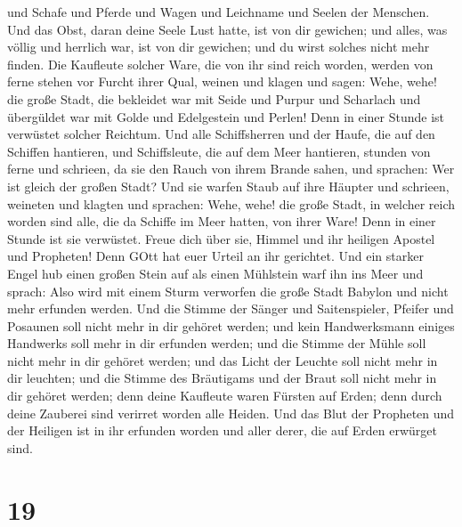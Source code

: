 und Schafe und Pferde und Wagen und Leichname und Seelen der Menschen.
 Und das Obst, daran deine Seele Lust hatte, ist von dir
gewichen; und alles, was völlig und herrlich war, ist von dir gewichen;
und du wirst solches nicht mehr finden.  Die Kaufleute
solcher Ware, die von ihr sind reich worden, werden von ferne stehen vor
Furcht ihrer Qual, weinen und klagen  und sagen: Wehe,
wehe! die große Stadt, die bekleidet war mit Seide und Purpur und
Scharlach und übergüldet war mit Golde und Edelgestein und Perlen!
 Denn in einer Stunde ist verwüstet solcher Reichtum. Und
alle Schiffsherren und der Haufe, die auf den Schiffen hantieren, und
Schiffsleute, die auf dem Meer hantieren, stunden von ferne
 und schrieen, da sie den Rauch von ihrem Brande sahen, und
sprachen: Wer ist gleich der großen Stadt?  Und sie warfen
Staub auf ihre Häupter und schrieen, weineten und klagten und sprachen:
Wehe, wehe! die große Stadt, in welcher reich worden sind alle, die da
Schiffe im Meer hatten, von ihrer Ware! Denn in einer Stunde ist sie
verwüstet.  Freue dich über sie, Himmel und ihr heiligen
Apostel und Propheten! Denn GOtt hat euer Urteil an ihr gerichtet.
 Und ein starker Engel hub einen großen Stein auf als einen
Mühlstein warf ihn ins Meer und sprach: Also wird mit einem Sturm
verworfen die große Stadt Babylon und nicht mehr erfunden werden.
 Und die Stimme der Sänger und Saitenspieler, Pfeifer und
Posaunen soll nicht mehr in dir gehöret werden; und kein Handwerksmann
einiges Handwerks soll mehr in dir erfunden werden; und die Stimme der
Mühle soll nicht mehr in dir gehöret werden;  und das Licht
der Leuchte soll nicht mehr in dir leuchten; und die Stimme des
Bräutigams und der Braut soll nicht mehr in dir gehöret werden; denn
deine Kaufleute waren Fürsten auf Erden; denn durch deine Zauberei sind
verirret worden alle Heiden.  Und das Blut der Propheten
und der Heiligen ist in ihr erfunden worden und aller derer, die auf
Erden erwürget sind.

\hypertarget{section-17}{%
\section{19}\label{section-17}}

